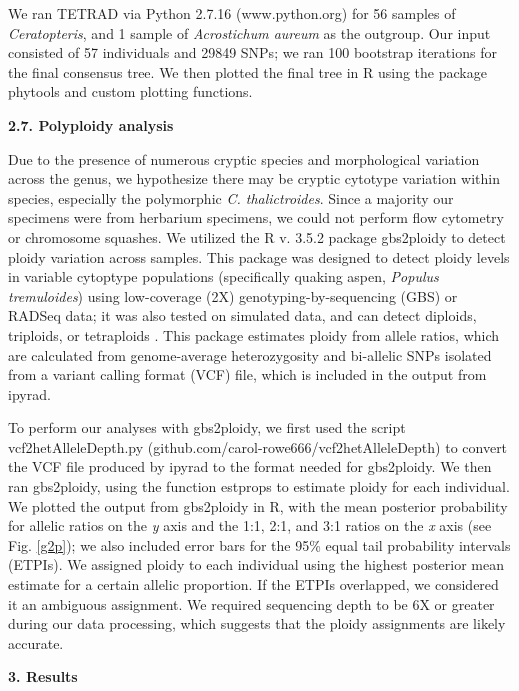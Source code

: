 \documentclass[12pt]{article}
\begin{document}
\begin{flushleft}
We ran {\small{TETRAD}} via Python 2.7.16 (www.python.org) for 56 samples of \textit{Ceratopteris}, and 1 sample of \textit{Acrostichum aureum} as the outgroup. Our input consisted of 57 individuals and 29849 SNPs; we ran 100 bootstrap iterations for the final consensus tree. We then plotted the final tree in R using the package phytools \autocite{Revell2012} and custom plotting functions.

\textbf{2.7. Polyploidy analysis}

Due to the presence of numerous cryptic species and morphological variation across the genus, we hypothesize there may be cryptic cytotype variation within species, especially the polymorphic \textit{C. thalictroides}. Since a majority our specimens were from herbarium specimens, we could not perform flow cytometry or chromosome squashes. We utilized the R v. 3.5.2 \autocite{R_352} package gbs2ploidy to detect ploidy variation across samples. This package was designed to detect ploidy levels in variable cytoptype populations (specifically quaking aspen, \textit{Populus tremuloides}) using low-coverage (2X) genotyping-by-sequencing (GBS) or RADSeq data; it was also tested on simulated data, and can detect diploids, triploids, or tetraploids \autocite{Gompert2017}. This package estimates ploidy from allele ratios, which are calculated from genome-average heterozygosity and bi-allelic SNPs isolated from a variant calling format (VCF) file, which is included in the output from ipyrad. 

To perform our analyses with gbs2ploidy, we first used the script vcf2hetAlleleDepth.py (github.com/carol-rowe666/vcf2hetAlleleDepth) to convert the VCF file produced by ipyrad to the format needed for gbs2ploidy. We then ran gbs2ploidy, using the function estprops to estimate ploidy for each individual. We plotted the output from gbs2ploidy in R, with the mean posterior probability for allelic ratios on the \textit{y} axis and the 1:1, 2:1, and 3:1 ratios on the \textit{x} axis (see Fig. \ref{g2p}); we also included error bars for the 95\% equal tail probability intervals (ETPIs). We assigned ploidy to each individual using the  highest posterior mean estimate for a certain allelic proportion. If the ETPIs overlapped, we considered it an ambiguous assignment. We required sequencing depth to be 6X or greater during our data processing, which suggests that the ploidy assignments are likely accurate.

\vspace{1cm}

{\large\textbf{3. Results}}


\end{flushleft}
\end{document}
